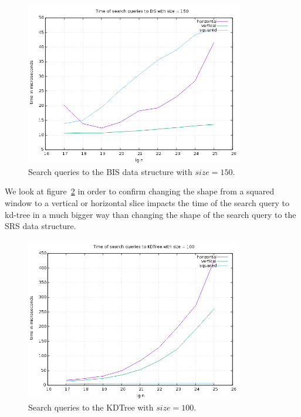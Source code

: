 \begin{figure}[h]
    \centering
    \includegraphics[width = 0.85\textwidth]{pictures/analysis/smalls/all_150.png}
    \caption{Search queries to the BIS data structure with $size=150$.}\label{fig:all_150}
\end{figure}

We look at figure~\ref{fig:all_kdtree_100} in order to confirm changing the shape from a squared window to a vertical or horizontal slice impacts the time of the search query to kd-tree in a much bigger way than changing the shape of the search query to the SRS data structure.

\begin{figure}[h]
    \centering
    \includegraphics[width = 0.85\textwidth]{pictures/analysis/smalls/all_kdtree_100.png}
    \caption{Search queries to the KDTree with $size=100$.}\label{fig:all_kdtree_100}
\end{figure}

